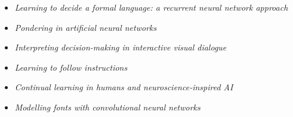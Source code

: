 {{{{{{{{
{\begin{itemize}
  \item[] \textit{Learning to decide a formal language: a recurrent neural network approach}
\end{itemize}
}

{
{\begin{itemize}
  \item[] \textit{Pondering in artificial neural networks}
\end{itemize}}}

{
{\begin{itemize}
  \item[] \textit{Interpreting decision-making in interactive visual dialogue}
\end{itemize}}}

{
{\begin{itemize}
  \item[] \textit{Learning to follow instructions}
\end{itemize}}}

{
{\begin{itemize}
  \item[] \textit{Continual learning in humans and neuroscience-inspired AI}
\end{itemize}}}

{
{\begin{itemize}
  \item[] \textit{Modelling fonts with convolutional neural networks}
\end{itemize}}}

}}}}}}}}
